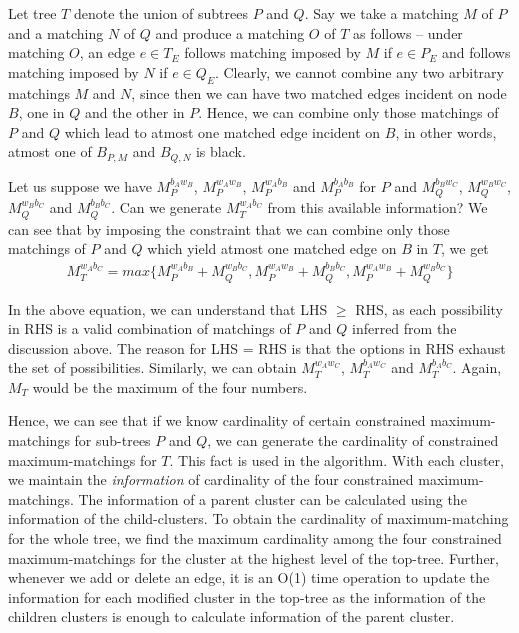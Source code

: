 \documentclass[a4paper,12pt]{article}
\begin{document}
Let tree $T$ denote the union of subtrees $P$ and $Q$. Say we take a matching $M$ of $P$ and a matching $N$ of $Q$ and produce a matching $O$ of $T$ as follows -- under matching $O$, an edge $e \in T_{E}$ follows matching imposed by $M$ if $e \in P_{E}$ and follows matching imposed by $N$ if $e \in Q_{E}$. Clearly, we cannot combine any two arbitrary matchings $M$ and $N$, since then we can have two matched edges incident on node $B$, one in $Q$ and the other in $P$. Hence, we can combine only those matchings of $P$ and $Q$ which lead to atmost one matched edge incident on $B$, in other words, atmost one of $B_{P,M}$ and $B_{Q,N}$ is black.

Let us suppose we have $M_{P}^{b_{A}w_{B}}$, $M_{P}^{w_{A}w_{B}}$, $M_{P}^{w_{A}b_{B}}$ and $M_{P}^{b_{A}b_{B}}$ for $P$ and $M_{Q}^{b_{B}w_{C}}$, $M_{Q}^{w_{B}w_{C}}$, $M_{Q}^{w_{B}b_{C}}$ and $M_{Q}^{b_{B}b_{C}}$. Can we generate $M_{T}^{w_{A}b_{C}}$ from this available information? We can see that by imposing the constraint that we can combine only those matchings of $P$ and $Q$ which yield atmost one matched edge on $B$ in $T$, we get
\begin{eqnarray}
M_{T}^{w_{A}b_{C}} = max\{M_{P}^{w_{A} b_{B}}+M_{Q}^{ w_{B} b_{C}}, M_{P}^{w_{A} w_{B}}+M_{Q}^{ b_{B} b_{C}}, M_{P}^{w_{A} w_{B}}+M_{Q}^{ w_{B} b_{C}}\}
\end{eqnarray}

In the above equation, we can understand that LHS $\ge$ RHS, as each possibility in RHS is a valid combination of matchings of $P$ and $Q$ inferred from the discussion above. The reason for LHS = RHS is that the options in RHS exhaust the set of possibilities. Similarly, we can obtain $M_{T}^{w_{A}w_{C}}$, $M_{T}^{b_{A}w_{C}}$ and $M_{T}^{b_{A}b_{C}}$. Again, $M_{T}$ would be the maximum of the four numbers.

Hence, we can see that if we know cardinality of certain constrained maximum-matchings for sub-trees $P$ and $Q$, we can generate the cardinality of constrained maximum-matchings for $T$. This fact is used in the algorithm. With each cluster, we maintain the {\em information} of cardinality of the four constrained maximum-matchings. The information of a parent cluster can be calculated using the information of the child-clusters. To obtain the cardinality of maximum-matching for the whole tree, we find the maximum cardinality among the four constrained maximum-matchings for the cluster at the highest level of the top-tree. Further, whenever we add or delete an edge, it is an O(1) time operation to update the information for each modified cluster in the top-tree as the information of the children clusters is enough to calculate information of the parent cluster.
\end{document}
